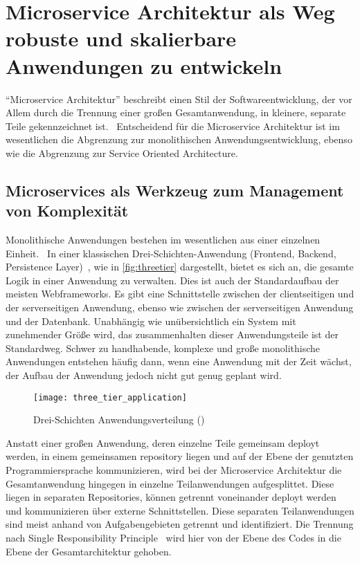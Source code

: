 \chapter{Microservice Architektur als Weg robuste und skalierbare Anwendungen zu entwickeln}
``Microservice Architektur'' beschreibt einen Stil der Softwareentwicklung, der vor Allem durch die Trennung einer großen Gesamtanwendung, in kleinere, separate Teile gekennzeichnet ist.~\cite[vgl.][Seite 2]{newman2015building}
Entscheidend für die Microservice Architektur ist im wesentlichen die Abgrenzung zur monolithischen Anwendungsentwicklung, ebenso wie die Abgrenzung zur Service Oriented Architecture.

\section{Microservices als Werkzeug zum Management von Komplexität}
Monolithische Anwendungen bestehen im wesentlichen aus einer einzelnen Einheit.~\cite[vgl.][]{Fowler:Intro} In einer klassischen Drei-Schichten-Anwendung (Frontend, Backend, Persistence Layer)~\cite[vgl.][]{MSDN:TTA}, wie in \autoref{fig:threetier} dargestellt, bietet es sich an, die gesamte Logik in einer Anwendung zu verwalten. Dies ist auch der Standardaufbau der meisten Webframeworks. Es gibt eine Schnittstelle zwischen der clientseitigen und der serverseitigen Anwendung, ebenso wie zwischen der serverseitigen Anwendung und der Datenbank. Unabhängig wie unübersichtlich ein System mit zunehmender Größe wird, das zusammenhalten dieser Anwendungsteile ist der Standardweg. Schwer zu handhabende, komplexe und große monolithische Anwendungen entstehen häufig dann, wenn eine Anwendung mit der Zeit wächst, der Aufbau der Anwendung jedoch nicht gut genug geplant wird.~\cite[vgl.][]{infaktuell}
\begin{figure}[!ht]
    \caption{Drei-Schichten Anwendungsverteilung (\cite{ThreeTieredDistribution})}
    \label{fig:threetier}
    \texttt{[image: three\_tier\_application]}
\end{figure}

Anstatt einer großen Anwendung, deren einzelne Teile gemeinsam deployt werden, in einem gemeinsamen repository liegen und auf der Ebene der genutzten Programmiersprache kommunizieren, wird bei der Microservice Architektur die Gesamtanwendung hingegen in einzelne Teilanwendungen aufgesplittet. Diese liegen in separaten Repositories, können getrennt voneinander deployt werden und kommunizieren über externe Schnittstellen. Diese separaten Teilanwendungen sind meist anhand von Aufgabengebieten getrennt und identifiziert. Die Trennung nach Single Responsibility Principle~\cite[vgl.][Seite 108]{Martin:SRP} wird hier von der Ebene des Codes in die Ebene der Gesamtarchitektur gehoben.

